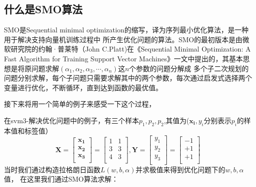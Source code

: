 \documentclass[UTF8]{ctexart}
\begin{document}
\subsection{什么是SMO算法}
SMO是Sequential minimal optimization的缩写，译为序列最小优化算法，是一种用于解决支持向量机训练过程中
所产生优化问题的算法。SMO的最初版本是由微软研究院的约翰·普莱特（John C.Platt)在《Sequential Minimal Optimization:
A Fast Algorithm for Training Support Vector Machines》一文中提出的，其基本思想是将原问题求解$(\alpha_1,\alpha_2,\alpha_3,\cdots,\alpha_n)$这$n$个参数的问题分解成
多个子二次规划的问题分别求解，每个子问题只需要求解其中的两个参数，每次通过启发式选择两个变量进行优化，不断循环，直到达到函数的最优值。



接下来将用一个简单的例子来感受一下这个过程，

在svm3-解决优化问题中的例子，有三个样本$p_1,p_2,p_2$,其值为($\boldsymbol{x_i},y_i$分别表示$p_i$的样本值和标签值）
$$
\boldsymbol X=
\begin{bmatrix}
    \boldsymbol {x_1} \\
    \boldsymbol {x_2} \\
    \boldsymbol {x_3} \\
\end{bmatrix}
=
\begin{bmatrix}
    1 & 1 \\
    3 & 3 \\
    4 & 3 \\
\end{bmatrix},
\boldsymbol Y=
\begin{bmatrix}
    y_1 \\
    y_2 \\
    y_3 \\
\end{bmatrix}
=
\begin{bmatrix}
    -1 \\
    +1 \\
    +1 \\
\end{bmatrix}
$$
当时我们通过构造拉格朗日函数$L(w,b,\alpha)$并求极值来得到优化问题下的$w,b,\alpha$值，
在这里我们通过SMO算法求解：
\end{document}

